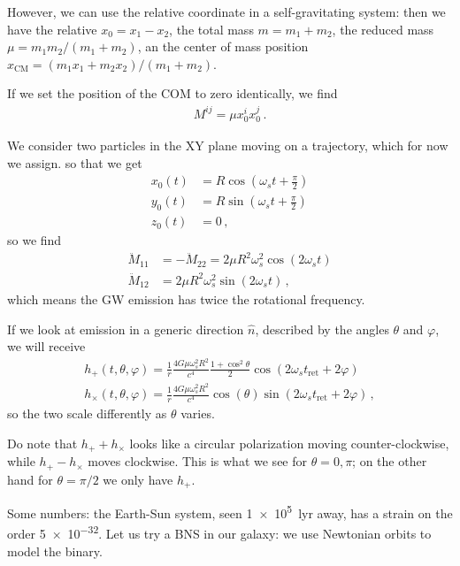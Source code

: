 \documentclass[main.tex]{subfiles}
\begin{document}
However, we can use the relative coordinate in a self-gravitating system: then we have the relative \(x_0 = x_1 - x_2 \), the total mass \(m = m_1 + m_2 \), the reduced mass \(\mu = m_1 m_2 / (m_1 + m_2 )\), an the center of mass position \(x _{\text{CM}} = (m_1 x_1 +m_2 x_2 ) / (m_1 + m_2 )\). 

If we set the position of the COM to zero identically, we find 
%
\begin{align}
M^{ij} = \mu x^{i}_{0} x^{j}_{0}
\,.
\end{align}

We consider two particles in the XY plane moving on a trajectory, which for now we assign. so that we get 
%
\begin{align}
x_0 (t) &= R \cos(\omega_{s} t + \frac{\pi}{2}) \\
y_0 (t) &= R \sin(\omega_{s} t + \frac{\pi}{2}) \\
z_0 (t) &= 0
\,,
\end{align}
%
so we find 
%
\begin{align}
\ddot{M}_{11} &= - \ddot{M}_{22} = 2 \mu R^2 \omega_{s}^2 \cos(2 \omega_{s}t)  \\
\ddot{M}_{12} &= 2 \mu R^2\omega_{s}^2  \sin( 2 \omega_{s}t)
\,,
\end{align}
%
which means the GW emission has twice the rotational frequency. 

If we look at emission in a generic direction \(\hat{n}\), described by the angles \(\theta \) and \(\varphi \), we will receive 
%
\begin{align}
h_{+} (t, \theta , \varphi ) = \frac{1}{r} \frac{4G \mu \omega_{s}^2 R^2}{c^{4}} \frac{1 + \cos^2\theta }{2} \cos(2 \omega_{s}t _{\text{ret}} + 2 \varphi  ) \\
h_{ \times } (t, \theta , \varphi ) = \frac{1}{r} \frac{4G \mu \omega_{s}^2 R^2}{c^{4}} \cos(\theta ) \sin(2 \omega_{s}t _{\text{ret}} + 2 \varphi  )
\,,
\end{align}
%
so the two scale differently as \(\theta \) varies. 

Do note that \(h_{+} + h_{ \times }\) looks like a circular polarization moving counter-clockwise, while \(h_{+} - h_{ \times }\) moves clockwise. This is what we see for \(\theta = 0, \pi \); on the other hand for \(\theta = \pi /2\) we only have \(h_{+}\). 


Some numbers: the Earth-Sun system, seen \SI{1e5}{lyr} away, has a strain on the order \num{5e-32}. 
Let us try a BNS in our galaxy: we use Newtonian orbits to model the binary. 
\end{document}
